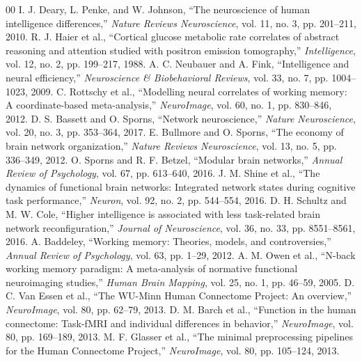 \documentclass[conference]{IEEEtran}
\begin{document}
\begin{thebibliography}{00}
 I. J. Deary, L. Penke, and W. Johnson, ``The neuroscience of human intelligence differences,'' \textit{Nature Reviews Neuroscience}, vol. 11, no. 3, pp. 201--211, 2010.
 R. J. Haier et al., ``Cortical glucose metabolic rate correlates of abstract reasoning and attention studied with positron emission tomography,'' \textit{Intelligence}, vol. 12, no. 2, pp. 199--217, 1988.
 A. C. Neubauer and A. Fink, ``Intelligence and neural efficiency,'' \textit{Neuroscience \& Biobehavioral Reviews}, vol. 33, no. 7, pp. 1004--1023, 2009.
 C. Rottschy et al., ``Modelling neural correlates of working memory: A coordinate-based meta-analysis,'' \textit{NeuroImage}, vol. 60, no. 1, pp. 830--846, 2012.
 D. S. Bassett and O. Sporns, ``Network neuroscience,'' \textit{Nature Neuroscience}, vol. 20, no. 3, pp. 353--364, 2017.
 E. Bullmore and O. Sporns, ``The economy of brain network organization,'' \textit{Nature Reviews Neuroscience}, vol. 13, no. 5, pp. 336--349, 2012.
 O. Sporns and R. F. Betzel, ``Modular brain networks,'' \textit{Annual Review of Psychology}, vol. 67, pp. 613--640, 2016.
 J. M. Shine et al., ``The dynamics of functional brain networks: Integrated network states during cognitive task performance,'' \textit{Neuron}, vol. 92, no. 2, pp. 544--554, 2016.
 D. H. Schultz and M. W. Cole, ``Higher intelligence is associated with less task-related brain network reconfiguration,'' \textit{Journal of Neuroscience}, vol. 36, no. 33, pp. 8551--8561, 2016.
 A. Baddeley, ``Working memory: Theories, models, and controversies,'' \textit{Annual Review of Psychology}, vol. 63, pp. 1--29, 2012.
 A. M. Owen et al., ``N-back working memory paradigm: A meta-analysis of normative functional neuroimaging studies,'' \textit{Human Brain Mapping}, vol. 25, no. 1, pp. 46--59, 2005.
 D. C. Van Essen et al., ``The WU-Minn Human Connectome Project: An overview,'' \textit{NeuroImage}, vol. 80, pp. 62--79, 2013.
 D. M. Barch et al., ``Function in the human connectome: Task-fMRI and individual differences in behavior,'' \textit{NeuroImage}, vol. 80, pp. 169--189, 2013.
 M. F. Glasser et al., ``The minimal preprocessing pipelines for the Human Connectome Project,'' \textit{NeuroImage}, vol. 80, pp. 105--124, 2013.

\end{thebibliography}
\end{document}
